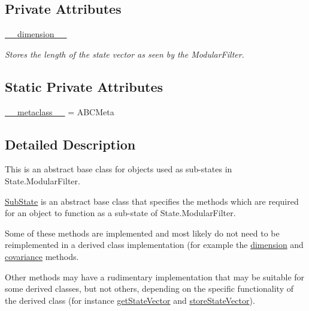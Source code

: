 \subsection*{Private Attributes}
\begin{DoxyCompactItemize}
\item 
\hyperlink{classmodest_1_1substates_1_1substate_1_1SubState_a5b1c0756a69da7f293a415c7d2d77843}{\+\_\+\+\_\+dimension\+\_\+\+\_\+}
\begin{DoxyCompactList}\small\item\em Stores the length of the state vector as seen by the Modular\+Filter. \end{DoxyCompactList}\end{DoxyCompactItemize}
\subsection*{Static Private Attributes}
\begin{DoxyCompactItemize}
\item 
\hyperlink{classmodest_1_1substates_1_1substate_1_1SubState_a31b0d49b08a8cd07b6d6e4b646d2a307}{\+\_\+\+\_\+metaclass\+\_\+\+\_\+} = A\+B\+C\+Meta
\end{DoxyCompactItemize}


\subsection{Detailed Description}
This is an abstract base class for objects used as sub-\/states in State.\+Modular\+Filter. 

\hyperlink{classmodest_1_1substates_1_1substate_1_1SubState}{Sub\+State} is an abstract base class that specifies the methods which are required for an object to function as a sub-\/state of State.\+Modular\+Filter.

Some of these methods are implemented and most likely do not need to be reimplemented in a derived class implementation (for example the \hyperlink{classmodest_1_1substates_1_1substate_1_1SubState_ab9027f6d1d7d57c47731612f519b7ee6}{dimension} and \hyperlink{classmodest_1_1substates_1_1substate_1_1SubState_a6e308aadd13962e476d2892ec728e3a5}{covariance} methods.

Other methods may have a rudimentary implementation that may be suitable for some derived classes, but not others, depending on the specific functionality of the derived class (for instance \hyperlink{classmodest_1_1substates_1_1substate_1_1SubState_aa18c8238415131b4b63cef0e4b2ff9fd}{get\+State\+Vector} and \hyperlink{classmodest_1_1substates_1_1substate_1_1SubState_a3644149dc4cc19c0e32d0b7040998c96}{store\+State\+Vector}).

